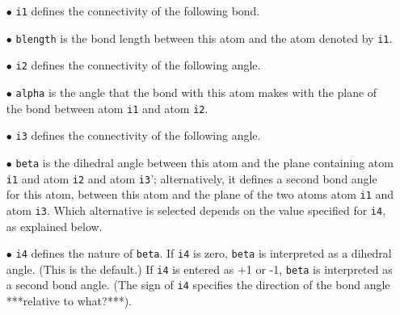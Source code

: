 \begin{enumerate}
    \begin{itemize}
    \item [$\bullet$]  {\tt i1} defines the connectivity of the following bond.  
    \item [$\bullet$]    {\tt blength} is the bond length between this atom and the atom denoted by {\tt i1}. 
    \item [$\bullet$]  {\tt i2} defines the connectivity of the following angle.  
    \item [$\bullet$]  {\tt alpha} is the angle that the bond with this atom makes with the plane of the bond between atom {\tt i1} and atom {\tt i2}.  
    \item [$\bullet$]  {\tt i3} defines the connectivity of the following angle.
    \item [$\bullet$]  {\tt beta}  is  the dihedral angle between
this atom and the plane containing atom {\tt i1} and atom {\tt i2} and atom 
        {\tt i3}'; alternatively, it defines a second bond angle for this atom, between this atom and the plane of the two atoms atom {\tt i1} and atom {\tt i3}.  Which alternative is selected depends on the value specified for {\tt i4}, as explained below. 
    \item [$\bullet$]  {\tt i4} defines the nature of {\tt beta}.  If {\tt i4} is zero, 
{\tt beta} is interpreted as a dihedral
        angle.  (This is the default.)  If {\tt i4} is entered as +1 or -1, {\tt beta} is interpreted as a second bond angle.  (The sign of {\tt i4} specifies the direction of the bond angle ***relative to what?***).
    \end{itemize}


\end{enumerate}

